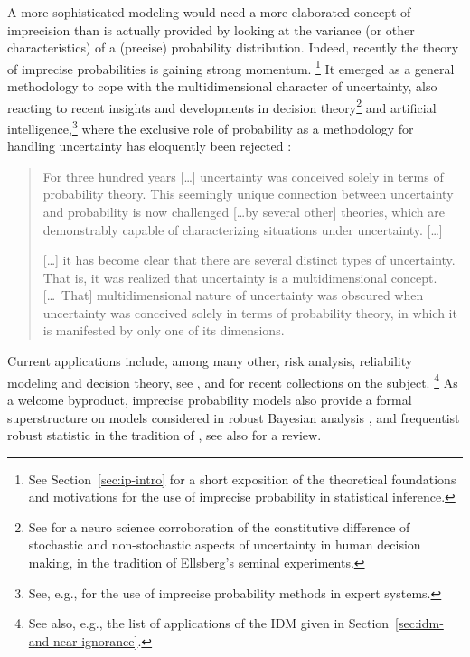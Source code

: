 A more sophisticated modeling would need a more elaborated concept
of imprecision than is actually provided by looking at the variance
(or other characteristics) of a (precise) probability distribution.
Indeed, recently the theory of imprecise probabilities \parencite{1991:walley,2001:weichselberger}
is gaining strong momentum.%
\footnote{See Section~\ref{sec:ip-intro} for a short exposition of the theoretical foundations
and motivations for the use of imprecise probability in statistical inference.}
It emerged as a general methodology to cope
with the multidimensional character of uncertainty, also reacting
to recent insights and developments in decision theory\footnote{See
\textcite{2005:hsu-bhatt} for a neuro science corroboration of the constitutive
difference of stochastic and non-stochastic aspects of uncertainty
in human decision making, in the tradition of Ellsberg's \parencite*{1961:ellsberg} seminal experiments.}
and artificial intelligence,\footnote{See, e.g., \textcite{1996:walley::expert}
for the use of imprecise probability methods in expert systems.}
where the exclusive role of probability
as a methodology for handling uncertainty has eloquently been rejected \cite{1999:klir}:
\begin{quotation}
\begin{small}
For three hundred years [\ldots] uncertainty was conceived solely in
terms of probability theory. This seemingly unique connection
between uncertainty and probability is now challenged [\ldots by several
other] theories, which are demonstrably capable of characterizing
situations under uncertainty. [\ldots]

[\ldots] it has become clear that there are several distinct types of
uncertainty. That is, it was realized that uncertainty is a
multidimensional concept. [\ldots\ That] multidimensional nature of
uncertainty was obscured when uncertainty was conceived solely in
terms of probability theory, in which it is manifested by only one
of its dimensions.
\end{small}
\end{quotation}

Current applications include, among many other, risk analysis,
reliability modeling and decision theory, see \textcite{2009:ISIPTA},
\textcite{2011:ISIPTA} and \textcite{2009:CoolenSchrijner} for recent collections on the subject.%
\footnote{See also, e.g., the list of applications of the IDM given in Section~\ref{sec:idm-and-near-ignorance}.}
As a welcome byproduct, imprecise probability models also provide
a formal superstructure on models considered in robust Bayesian analysis \parencite{2000:rios}, and
frequentist robust statistic in the tradition of \textcite{1973:huberstrassen},
see also \textcite{2009:augustin-hable} for a review.

